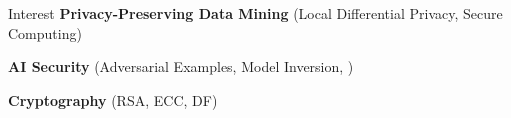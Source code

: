 \begin{rubric}{Interest}
\entry*[]%
	\textbf{Privacy-Preserving Data Mining} (Local Differential Privacy, Secure Computing)
	
\entry*[]%
	\textbf{AI Security} (Adversarial Examples, Model Inversion, )
	
\entry*[]%
	\textbf{Cryptography} (RSA, ECC, DF)
\end{rubric}